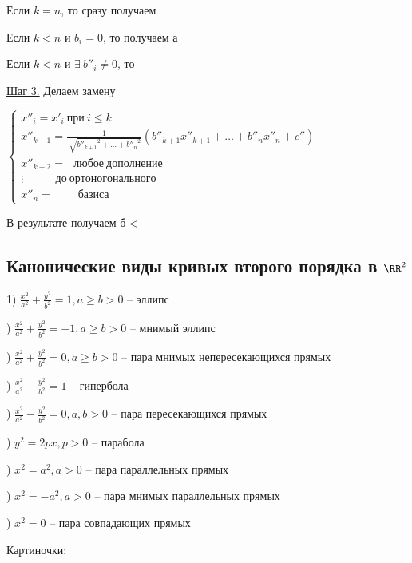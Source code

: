Если $k = n$, то сразу получаем 

Если $k < n$ и $b_i = 0$, то получаем а

Если $k < n$ и $\exists \ b''_i \neq 0$, то

\bigskip
\underline{Шаг 3.} Делаем замену

$\begin{cases} x''_i = x'_i \ при \ i \leqslant k \\ x''_{k+1} = \frac{1}{\sqrt[]{{b''_{k+1}}^2 + \dots + {b''_n}^2}}(b''_{k+1} x''_{k+1} + \dots + b''_n x''_n + c'') \\ 
x''_{k + 2} = \ \ \ любое \ дополнение \\ 
\vdots \ \ \ \ \ \ \ \  \ \ \ \ \ до \ ортоногонального \\
x''_n = \ \ \  \ \ \ \ \ \ \ базиса
\end{cases}$

В результате получаем б $\lhd$

\subsection{Канонические виды кривых второго порядка в $\RR^2$}

1) $\frac{x^2}{a^2} + \frac{y^2}{b^2} = 1, a\geqslant b > 0$ -- эллипс

) $\frac{x^2}{a^2} + \frac{y^2}{b^2} = -1, a\geqslant b > 0$ -- мнимый эллипс

) $\frac{x^2}{a^2} + \frac{y^2}{b^2} = 0, a\geqslant b > 0$ -- пара мнимых непересекающихся прямых

) $\frac{x^2}{a^2} - \frac{y^2}{b^2} = 1$ -- гипербола

) $\frac{x^2}{a^2} - \frac{y^2}{b^2} = 0, a, b > 0$ -- пара пересекающихся прямых

) $y^2 = 2px, p > 0$ -- парабола

) $x^2 = a^2, a > 0$ -- пара параллельных прямых

) $x^2 = -a^2, a > 0$ -- пара мнимых параллельных прямых

) $x^2 = 0$ -- пара совпадающих прямых

\bigskip
Картиночки:

